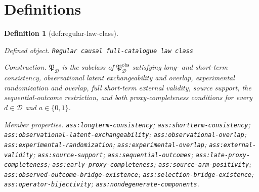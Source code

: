 \documentclass{article}
\newtheorem{definition}{Definition}
\begin{document}
\section{Definitions}

\begin{definition}[def:regular-law-class]\label{def:regular-law-class}
\par\smallskip\noindent\emph{Defined object.} \texttt{Regular causal full-\allowbreak{}catalogue law class}
\par\smallskip\noindent\emph{Construction.} \(\mathfrak P_{\mathcal D}\) is the subclass of \(\mathfrak P_{\mathcal D}^{\mathrm{obs}}\) satisfying long- and short-term consistency, observational latent exchangeability and overlap, experimental randomization and overlap, full short-term external validity, source support, the sequential-outcome restriction, and both proxy-completeness conditions for every \(d\in\mathcal D\) and \(a\in\{0,1\}\).
\par\smallskip\noindent\emph{Member properties.} \texttt{ass:\allowbreak{}longterm-\allowbreak{}consistency}; \texttt{ass:\allowbreak{}shortterm-\allowbreak{}consistency}; \texttt{ass:\allowbreak{}observational-\allowbreak{}latent-\allowbreak{}exchangeability}; \texttt{ass:\allowbreak{}observational-\allowbreak{}overlap}; \texttt{ass:\allowbreak{}experimental-\allowbreak{}randomization}; \texttt{ass:\allowbreak{}experimental-\allowbreak{}overlap}; \texttt{ass:\allowbreak{}external-\allowbreak{}validity}; \texttt{ass:\allowbreak{}source-\allowbreak{}support}; \texttt{ass:\allowbreak{}sequential-\allowbreak{}outcomes}; \texttt{ass:\allowbreak{}late-\allowbreak{}proxy-\allowbreak{}completeness}; \texttt{ass:\allowbreak{}early-\allowbreak{}proxy-\allowbreak{}completeness}; \texttt{ass:\allowbreak{}source-\allowbreak{}arm-\allowbreak{}positivity}; \texttt{ass:\allowbreak{}observed-\allowbreak{}outcome-\allowbreak{}bridge-\allowbreak{}existence}; \texttt{ass:\allowbreak{}selection-\allowbreak{}bridge-\allowbreak{}existence}; \texttt{ass:\allowbreak{}operator-\allowbreak{}bijectivity}; \texttt{ass:\allowbreak{}nondegenerate-\allowbreak{}components}.
\end{definition}
\end{document}
